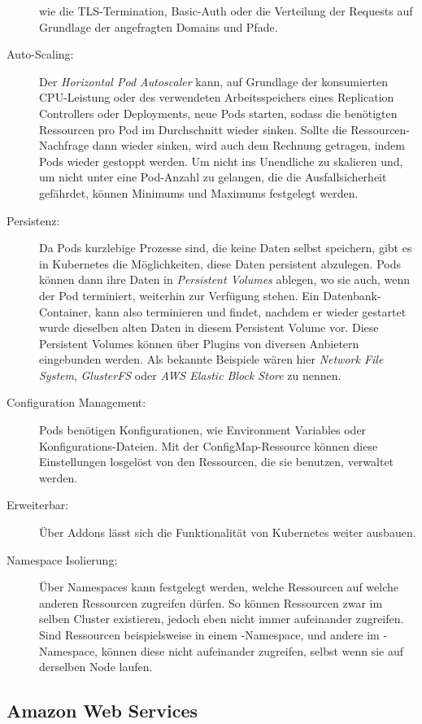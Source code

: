 \begin{description}
  wie die TLS-Termination, Basic-Auth oder die Verteilung der Requests auf Grundlage
  der angefragten Domains und Pfade.
  \item[Auto-Scaling:]
  Der \emph{Horizontal Pod Autoscaler} kann, auf Grundlage der konsumierten CPU-Leistung
  oder des verwendeten Arbeitsspeichers eines
  Replication Controllers oder Deployments, neue Pods starten, sodass die benötigten
  Ressourcen pro Pod im Durchschnitt wieder sinken. Sollte die
  Ressourcen-Nachfrage dann wieder sinken,
  wird auch dem Rechnung getragen, indem Pods wieder gestoppt werden. Um nicht ins
  Unendliche zu skalieren und, um nicht unter eine Pod-Anzahl zu gelangen, die
  die Ausfallsicherheit gefährdet, können Minimums und Maximums festgelegt werden.
  \item[Persistenz:] Da Pods kurzlebige Prozesse sind, die keine Daten selbst
  speichern, gibt es in Kubernetes die Möglichkeiten, diese Daten
  persistent abzulegen.
  Pods können dann ihre Daten in \emph{Persistent Volumes} ablegen, wo sie auch, wenn
  der Pod terminiert,
  weiterhin zur Verfügung stehen. Ein Datenbank-Container, kann also terminieren
  und findet, nachdem er wieder gestartet wurde dieselben alten Daten
  in diesem Persistent Volume vor.
  Diese Persistent Volumes können über Plugins von diversen Anbietern
  eingebunden werden.
  Als bekannte Beispiele wären hier \emph{Network File System}, \emph{GlusterFS}
  oder \emph{AWS Elastic Block Store}
  zu nennen.
  \item[Configuration Management:]
  Pods benötigen Konfigurationen, wie Environment Variables oder Konfigurations-Dateien.
  Mit der ConfigMap-Ressource können diese Einstellungen losgelöst von den Ressourcen,
  die sie benutzen, verwaltet werden.
  \item[Erweiterbar:]
  Über Addons lässt sich die Funktionalität von Kubernetes weiter ausbauen.
  \item[Namespace Isolierung:]
  Über Namespaces kann festgelegt werden, welche Ressourcen auf welche
  anderen Ressourcen zugreifen dürfen. So können Ressourcen zwar im selben Cluster
  existieren, jedoch eben nicht immer aufeinander zugreifen. Sind Ressourcen
  beispielsweise in einem -Namespace, und andere im
  -Namespace, können diese nicht aufeinander zugreifen,
  selbst wenn sie auf derselben Node laufen.
\end{description}

\subsection{Amazon Web Services}

